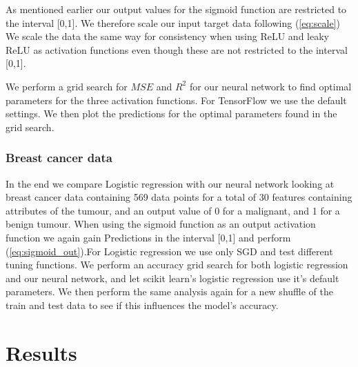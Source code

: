 \documentclass[11pt]{article}
\begin{document}
As mentioned earlier our output values for the sigmoid function are restricted to the interval [0,1]. We therefore scale our input target data following (\ref{eq:scale})
We scale the data the same way for consistency when using ReLU and leaky ReLU as activation functions even though these are not restricted to the interval [0,1].

We perform a grid search for $MSE$ and $R^2$ for our neural network to find optimal parameters for the three activation functions. For TensorFlow we use the default settings. We then plot the predictions for the optimal parameters found in the grid search.

\subsubsection*{Breast cancer data}
In the end we compare Logistic regression with our neural network looking at breast cancer data containing 569 data points for a total of 30 features containing attributes of the tumour, and an output value of 0 for a malignant, and 1 for a benign tumour. When using the sigmoid function as an output activation function we again gain Predictions in the interval [0,1] and perform (\ref{eq:sigmoid_out}).For Logistic regression we use only SGD and test different tuning functions. We perform an accuracy grid search for both logistic regression and our neural network, and let scikit learn's logistic regression use it's default parameters. We then perform the same analysis again for a new shuffle of the train and test data to see if this influences the model's accuracy.

\section{Results}
\end{document}
